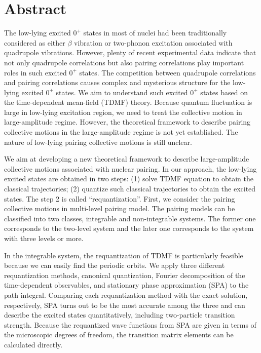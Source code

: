 \documentclass[11pt]{book} %
\begin{document}
\chapter*{Abstract}
\thispagestyle{empty}

The low-lying excited $0^+$ states in most of nuclei had been traditionally considered as either $\beta$ vibration or two-phonon excitation associated with quadrupole vibrations. However, plenty of recent experimental data indicate that not only quadrupole correlations but also pairing correlations play important roles in such excited $0^+$ states. 
The competition between quadrupole correlations and pairing correlations causes complex and mysterious structure for the low-lying excited $0^+$ states. 
We aim to understand such excited $0^+$ states based on the time-dependent mean-field (TDMF) theory. Because quantum fluctuation is large in low-lying excitation region, we need to treat the collective motion in large-amplitude regime. However, the theoretical framework to describe pairing collective motions in the large-amplitude regime is not yet established. The nature of low-lying pairing collective motions is still unclear.

We aim at developing a new theoretical framework to describe large-amplitude collective motions associated with nuclear pairing. In our approach, the low-lying excited states are obtained in two steps: (1) solve TDMF equation to obtain the classical trajectories; (2) quantize such classical trajectories to obtain the excited states. The step 2 is called ``requantization''. 
First, we consider the pairing collective motions in multi-level pairing model. The pairing models can be classified into two classes, integrable and non-integrable systems. The former one corresponds to the two-level system and the later one corresponds to the system with three levels or more. 

In the integrable system, the requantization of TDMF is particularly feasible because we can easily find the periodic orbits. We apply three different requantization methods, canonical quantization, Fourier decomposition of the time-dependent observables, and stationary phase approximation (SPA) to the path integral. Comparing each requantization method with the exact solution, respectively, SPA turns out to be the most accurate among the three and can describe the excited states quantitatively, including two-particle transition strength. Because the requantized wave functions from SPA are given in terms of the microscopic degrees of freedom, the transition matrix elements can be calculated directly.
\end{document}
